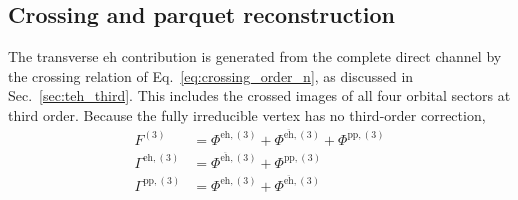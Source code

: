\documentclass[aip,jcp,reprint,noshowkeys,superscriptaddress]{revtex4-1}
\newcommand{\eh}{\text{eh}}
\newcommand{\teh}{\overline{\text{eh}}}
\newcommand{\pp}{\text{pp}}
\begin{document}
\subsection{Crossing and parquet reconstruction}

The transverse $\eh$ contribution is generated from the complete direct
channel by the crossing relation of Eq.~\eqref{eq:crossing_order_n}, as
discussed in Sec.~\ref{sec:teh_third}.
This includes the crossed images of all four orbital sectors at third order.
Because the fully irreducible vertex has no third-order correction,
\begin{align}
    F^{(3)}
    &=
    \Phi^{\eh,(3)}+\Phi^{\teh,(3)}+\Phi^{\pp,(3)}
    \\
    \Gamma^{\eh,(3)}
    &=
    \Phi^{\teh,(3)}+\Phi^{\pp,(3)}
    \\
    \Gamma^{\pp,(3)}
    &=
    \Phi^{\eh,(3)}+\Phi^{\teh,(3)}
    \label{eq:parquet_third_reconstruction}
\end{align}
\end{document}
